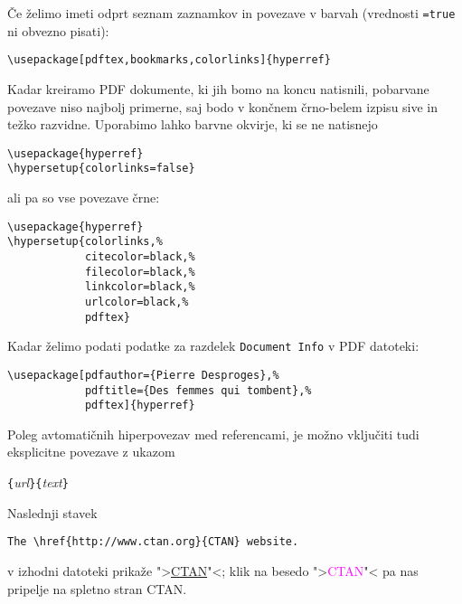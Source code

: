 Če želimo imeti odprt seznam zaznamkov in povezave v barvah
(vrednosti \texttt{=true} ni obvezno pisati):
\begin{code}
\begin{verbatim}
\usepackage[pdftex,bookmarks,colorlinks]{hyperref}
\end{verbatim}
\end{code}

Kadar kreiramo PDF dokumente, ki jih bomo na koncu natisnili, pobarvane
povezave niso najbolj primerne, saj bodo v končnem črno-belem izpisu sive in težko razvidne. Uporabimo lahko barvne okvirje, ki se ne natisnejo
\begin{code}
\begin{verbatim}
\usepackage{hyperref}
\hypersetup{colorlinks=false}
\end{verbatim}
\end{code}
\noindent ali pa so vse povezave črne:
\begin{code}
\begin{verbatim}
\usepackage{hyperref}
\hypersetup{colorlinks,%
            citecolor=black,%
            filecolor=black,%
            linkcolor=black,%
            urlcolor=black,%
            pdftex}
\end{verbatim}
\end{code}

Kadar želimo podati podatke za razdelek
  \texttt{Document Info} v PDF datoteki:
\begin{code}
\begin{verbatim}
\usepackage[pdfauthor={Pierre Desproges},%
            pdftitle={Des femmes qui tombent},%
            pdftex]{hyperref}
\end{verbatim}
\end{code}

\vspace{\baselineskip}

Poleg avtomatičnih hiperpovezav med referencami, je možno vključiti tudi
eksplicitne povezave z ukazom 
\begin{lscommand}
\verb|{|\emph{url}\verb|}{|\emph{text}\verb|}|
\end{lscommand}

Naslednji stavek
\begin{code}
\begin{verbatim}
The \href{http://www.ctan.org}{CTAN} website.
\end{verbatim}
\end{code}
v izhodni datoteki prikaže ">\href{http://www.ctan.org}{CTAN}"<;
klik na besedo ">\textcolor{magenta}{CTAN}"<
pa nas pripelje na spletno stran CTAN.

